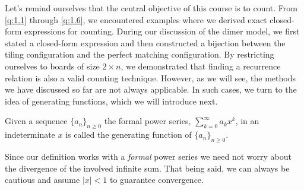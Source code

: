 Let's remind ourselves that the central objective of this course is to count. From \cref{q:1.1} through \cref{q:1.6}, we encountered examples where we derived exact closed-form expressions for counting. During our discussion of the dimer model, we first stated a closed-form expression and then constructed a bijection between the tiling configuration and the perfect matching configuration. By restricting ourselves to boards of size $2 \times n$, we demonstrated that finding a recurrence relation is also a valid counting technique. However, as we will see, the methods we have discussed so far are not always applicable. In such cases, we turn to the idea of generating functions, which we will introduce next.

\begin{definition}
	Given a sequence $\{a_{n}\}_{n \ge 0}$ the formal power series, $\sum_{k=0}^{\infty}a_{k}x^k$, in an indeterminate $x$ is called the generating function of $\{a_{n}\}_{n \ge 0}$.
 \label{d:1.4}
\end{definition}

Since our definition works with a \textit{formal} power series we need not worry about the divergence of the involved infinite sum. That being said, we can always be cautious and assume $|x|<1$ to guarantee convergence. 

